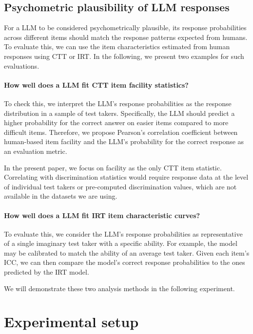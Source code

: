 \documentclass[11pt]{article}
\begin{document}
\subsection{Psychometric plausibility of LLM responses}

For a LLM to be considered psychometrically plausible, its response probabilities across different items should match the response patterns expected from humans. To evaluate this, we can use the item characteristics estimated from human responses using CTT or IRT.
In the following, we present two examples for such evaluations.

\paragraph{How well does a LLM fit CTT item facility statistics?}

To check this, we interpret the LLM's response probabilities as the response distribution in a sample of test takers. Specifically, the LLM should predict a higher probability for the correct answer on easier items compared to more difficult items. Therefore, we propose Pearson's correlation coefficient between human-based item facility and the LLM's probability for the correct response as an evaluation metric.

In the present paper, we focus on facility as the only CTT item statistic. Correlating with discrimination statistics would require response data at the level of individual test takers or pre-computed discrimination values, which are not available in the datasets we are using.

\paragraph{How well does a LLM fit IRT item characteristic curves?}

To evaluate this, we consider the LLM's response probabilities as representative of a single imaginary test taker with a specific ability. For example, the model may be calibrated to match the ability of an average test taker. Given each item's ICC, we can then compare the model's correct response probabilities to the ones predicted by the IRT model.

We will demonstrate these two analysis methods in the following experiment.


\section{Experimental setup}
\label{sec:experiment}
\end{document}
